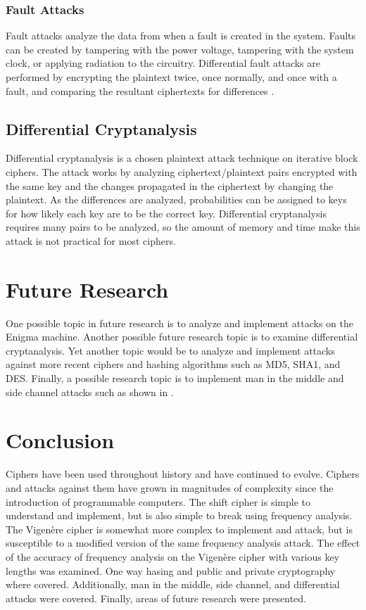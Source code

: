 \documentclass[12pt]{article}
\begin{document}
\subsubsection{Fault Attacks}
Fault attacks analyze the data from when a fault is created in the system. Faults can be created by tampering with the power voltage, tampering with the system clock, or applying radiation to the circuitry. Differential fault attacks are performed by encrypting the plaintext twice, once normally, and once with a fault, and comparing the resultant ciphertexts for differences \cite[pg. 7]{sidechannel}.

\subsection{Differential Cryptanalysis}
Differential cryptanalysis is a chosen plaintext attack technique on iterative block ciphers. The attack works by analyzing ciphertext/plaintext pairs encrypted with the same key and the changes propagated in the ciphertext by changing the plaintext. As the differences are analyzed, probabilities can be assigned to keys for how likely each key are to be the correct key. Differential cryptanalysis requires many pairs to be analyzed, so the amount of memory and time make this attack is not practical for most ciphers\cite[pg. 285-290]{appcrypt}.

\section{Future Research}
One possible topic in future research is to analyze and implement attacks on the Enigma machine. Another possible future research topic is to examine differential cryptanalysis. Yet another topic would be to analyze and implement attacks against more recent ciphers and hashing algorithms such as MD5, SHA1, and DES. Finally, a possible research topic is to implement man in the middle and side channel attacks such as shown in \cite{flushreload}.

\section{Conclusion}
Ciphers have been used throughout history and have continued to evolve. Ciphers  and attacks against them have grown in magnitudes of complexity since the introduction of programmable computers. The shift cipher is simple to understand and implement, but is also simple to break using frequency analysis. The Vigen\`{e}re cipher is somewhat more complex to implement and attack, but is susceptible to a modified version of the same frequency analysis attack. The effect of the accuracy of frequency analysis on the Vigen\`{e}re cipher with various key lengths was examined. One way hasing and public and private cryptography where covered. Additionally, man in the middle, side channel, and differential attacks were covered. Finally, areas of future research were presented.
\end{document}
